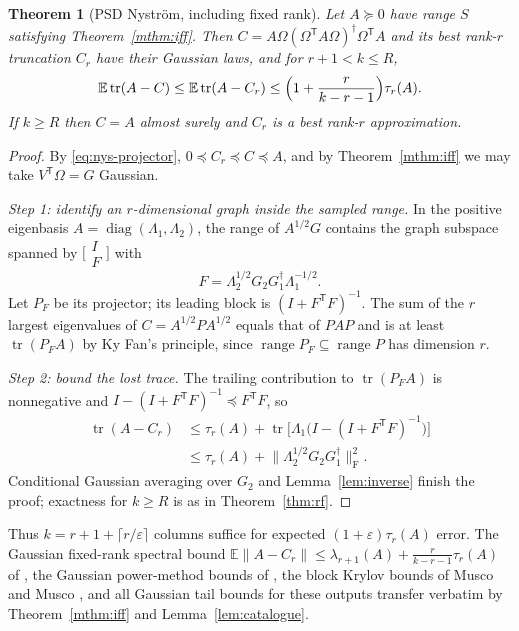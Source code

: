 \documentclass[11pt,a4paper]{article}
\newtheorem{theorem}{Theorem}[section]
\theoremstyle{definition}
\theoremstyle{remark}
\numberwithin{equation}{section}
\newcommand{\E}{\mathbb E}
\newcommand{\T}{{\mathsf T}}
\newcommand{\tr}{\operatorname{tr}}
\newcommand{\range}{\operatorname{range}}
\newcommand{\diag}{\operatorname{diag}}
\newcommand{\norm}[1]{\lVert#1\rVert}
\newcommand{\eps}{\varepsilon}
\newcommand{\F}{\mathrm F}
\begin{document}
\begin{theorem}[PSD Nystr\"om, including fixed rank]\label{thm:nys}
Let $A\succeq0$ have range $S$ satisfying Theorem~\ref{mthm:iff}. Then
$C=A\Omega(\Omega^\T A\Omega)^\dagger\Omega^\T A$ and its best rank-$r$
truncation $C_r$ have their Gaussian laws, and for $r+1<k\le R$,
\begin{equation}\label{eq:nys}
 \E\tr(A-C)\le\E\tr(A-C_r)\le\Bigl(1+\frac r{k-r-1}\Bigr)\tau_r(A).
\end{equation}
If $k\ge R$ then $C=A$ almost surely and $C_r$ is a best rank-$r$ approximation.
\end{theorem}

\begin{proof}
By \eqref{eq:nys-projector}, $0\preceq C_r\preceq C\preceq A$, and by
Theorem~\ref{mthm:iff} we may take $V^\T\Omega=G$ Gaussian.

\emph{Step 1: identify an $r$-dimensional graph inside the sampled range.}
In the positive
eigenbasis $A=\diag(\Lambda_1,\Lambda_2)$, the range of $A^{1/2}G$ contains
the graph subspace spanned by
$\bigl[\begin{smallmatrix}I\\F\end{smallmatrix}\bigr]$ with
\[
 F=\Lambda_2^{1/2}G_2G_1^\dagger\Lambda_1^{-1/2}.
\]
Let $P_F$ be its projector;
its leading block is $(I+F^\T F)^{-1}$. The sum of the $r$ largest eigenvalues
of $C=A^{1/2}PA^{1/2}$ equals that of $PAP$ and is at least $\tr(P_FA)$ by Ky
Fan's principle, since $\range P_F\subseteq\range P$ has dimension $r$.

\emph{Step 2: bound the lost trace.} The
trailing contribution to $\tr(P_FA)$ is nonnegative and
$I-(I+F^\T F)^{-1}\preceq F^\T F$, so
\[
 \begin{aligned}
 \tr(A-C_r)
 &\le\tau_r(A)+\tr\bigl[\Lambda_1\bigl(I-(I+F^\T F)^{-1}\bigr)\bigr]\\
 &\le\tau_r(A)+\norm{\Lambda_2^{1/2}G_2G_1^\dagger}_\F^2 .
 \end{aligned}
\]
Conditional Gaussian averaging over $G_2$ and Lemma~\ref{lem:inverse} finish
the proof; exactness for $k\ge R$ is as in Theorem~\ref{thm:rf}.
\end{proof}

Thus $k=r+1+\lceil r/\eps\rceil$ columns suffice for expected
$(1+\eps)\tau_r(A)$ error. The Gaussian fixed-rank spectral bound
$\E\norm{A-C_r}\le\lambda_{r+1}(A)+\frac r{k-r-1}\tau_r(A)$ of
\cite[Theorem~4.1]{TYUCpsd}, the Gaussian power-method bounds of \cite{HMT},
the block Krylov bounds of Musco and Musco \cite{MM}, and all Gaussian tail bounds for these outputs transfer
verbatim by Theorem~\ref{mthm:iff} and Lemma~\ref{lem:catalogue}.
\end{document}
